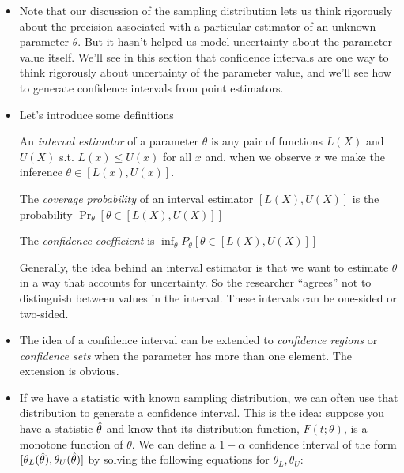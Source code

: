 \begin{itemize}[leftmargin=0pt]  

\item Note that our discussion of the sampling distribution lets us
  think rigorously about the precision associated with a particular
  estimator of an unknown parameter $\theta$.  But it hasn't helped us
  model uncertainty about the parameter value itself.  We'll see in
  this section that confidence intervals are one way to think
  rigorously about uncertainty of the parameter value, and we'll see
  how to generate confidence intervals from point estimators.

\item Let's introduce some definitions
  \begin{defn}
    An \emph{interval estimator} of a parameter $\theta$ is any pair of
    functions $L(X)$ and $U(X)$ s.t. $L(x) \leq U(x)$ for all $x$ and,
    when we observe $x$ we make the inference $\theta \in [L(x), U(x)]$.
  \end{defn}

  \begin{defn}
    The \emph{coverage probability} of an interval estimator
    $[L(X), U(X)]$ is the probability $\Pr_\theta[\theta \in [L(X), U(X)]]$
  \end{defn}

  \begin{defn}
    The \emph{confidence coefficient} is $\inf_\theta P_\theta[\theta \in [L(X), U(X)]]$
  \end{defn}

  Generally, the idea behind an interval estimator is that we want to
  estimate $\theta$ in a way that accounts for uncertainty.  So the
  researcher ``agrees'' not to distinguish between values in the
  interval.  These intervals can be one-sided or two-sided.

\item The idea of a confidence interval can be extended to
  \emph{confidence regions} or \emph{confidence sets} when the
  parameter has more than one element.  The extension is obvious.

\item If we have a statistic with known sampling distribution, we can
  often use that distribution to generate a confidence interval.  This
  is the idea: suppose you have a statistic $\hat{\theta}$ and know that its
  distribution function, $F(t; \theta)$, is a monotone function of $\theta$.  We
  can define a $1-\alpha$ confidence interval of the form $[\theta_L(\hat{\theta}),
  \theta_U(\hat{\theta})]$ by solving the following equations for $\theta_L, \theta_U$:


\end{itemize}
